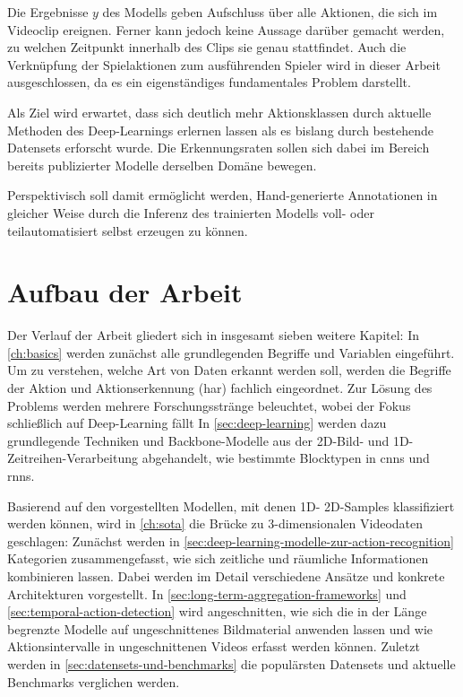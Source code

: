 Die Ergebnisse $y$ des Modells geben Aufschluss über alle Aktionen, die sich im Videoclip ereignen.
Ferner kann jedoch keine Aussage darüber gemacht werden, zu welchen Zeitpunkt innerhalb des Clips sie genau stattfindet.
Auch die Verknüpfung der Spielaktionen zum ausführenden Spieler wird in dieser Arbeit ausgeschlossen, da es ein eigenständiges fundamentales Problem darstellt.

Als Ziel wird erwartet, dass sich deutlich mehr Aktionsklassen durch aktuelle Methoden des Deep-Learnings erlernen lassen als es bislang durch bestehende Datensets erforscht wurde.
Die Erkennungsraten sollen sich dabei im Bereich bereits publizierter Modelle derselben Domäne bewegen.

Perspektivisch soll damit ermöglicht werden, Hand-generierte Annotationen in gleicher Weise durch die Inferenz des trainierten Modells voll- oder teilautomatisiert selbst erzeugen zu können.

\section{Aufbau der Arbeit}
\label{sec:aufbau-der-arbeit}

Der Verlauf der Arbeit gliedert sich in insgesamt sieben weitere Kapitel:
In \autoref{ch:basics} werden zunächst alle grundlegenden Begriffe und Variablen eingeführt.
Um zu verstehen, welche Art von Daten erkannt werden soll, werden die Begriffe der Aktion und Aktionserkennung (\gls{har}) fachlich eingeordnet.
Zur Lösung des Problems werden mehrere Forschungsstränge beleuchtet, wobei der Fokus schließlich auf Deep-Learning fällt
In \autoref{sec:deep-learning} werden dazu grundlegende Techniken und Backbone-Modelle aus der 2D-Bild- und 1D-Zeitreihen-Verarbeitung abgehandelt, wie bestimmte Blocktypen in \glspl{cnn} und \glspl{rnn}.

Basierend auf den vorgestellten Modellen, mit denen 1D- \bzw 2D-Samples klassifiziert werden können, wird in \autoref{ch:sota} die Brücke zu 3-dimensionalen Videodaten geschlagen:
Zunächst werden in \autoref{sec:deep-learning-modelle-zur-action-recognition} Kategorien zusammengefasst, wie sich zeitliche und räumliche Informationen kombinieren lassen.
Dabei werden im Detail verschiedene Ansätze und konkrete Architekturen vorgestellt.
In \autoref{sec:long-term-aggregation-frameworks} und \autoref{sec:temporal-action-detection} wird angeschnitten, wie sich die in der Länge begrenzte Modelle auf ungeschnittenes Bildmaterial anwenden lassen und wie Aktionsintervalle in ungeschnittenen Videos erfasst werden können.
Zuletzt werden in \autoref{sec:datensets-und-benchmarks} die populärsten Datensets und aktuelle Benchmarks verglichen werden.

